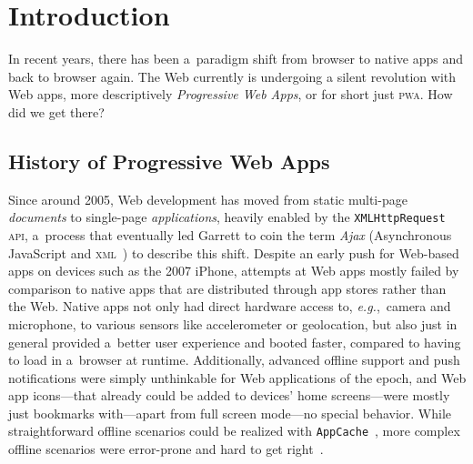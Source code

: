 \documentclass[sigconf]{acmart}
\begin{document}
%
%


\maketitle

\section{Introduction}

In recent years, there has been a~paradigm shift
from browser to native apps and back to browser again.
The Web currently is undergoing a silent revolution with Web apps,
more descriptively \emph{Progressive Web Apps},
or for short just \textsc{pwa}.
How did we get there?

\subsection{History of Progressive Web Apps}

Since around 2005, Web development has moved from static multi-page \emph{documents}
to single-page \emph{applications}, heavily enabled by the \texttt{XMLHttpRequest} \textsc{api},
a~process that eventually led Garrett to coin the term \emph{Ajax}
(Asynchronous JavaScript and \textsc{xml}~\cite{garret2005ajax}) to describe this shift.
Despite an early push for Web-based apps on devices such as the 2007 iPhone,
attempts at Web apps mostly failed by comparison to native apps
that are distributed through app stores rather than the Web.
Native apps not only had direct hardware access to, \emph{e.g.},\ camera and microphone,
to various sensors like accelerometer or geolocation, but also just in general provided
a~better user experience and booted faster, compared to having to load in a~browser at runtime.
Additionally, advanced offline support and push notifications were simply unthinkable
for Web applications of the epoch, and Web app icons---that
already could be added to devices' home screens---were
mostly just bookmarks with---apart from full screen mode---no special behavior.
While straightforward offline scenarios could be realized with
\texttt{AppCache}~\cite{vankesteren2008offlinewebapps}, more complex offline scenarios were error-prone
and hard to get right~\cite{archibald2012douchebag}.
\end{document}

